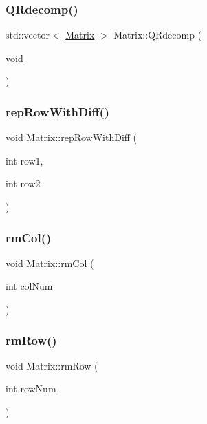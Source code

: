 \mbox{\label{class_matrix_ae7c92ceca24b8ca00926c93180c4cc24}} 
\subsubsection{\texorpdfstring{Q\+Rdecomp()}{QRdecomp()}}
{\footnotesize\ttfamily std\+::vector$<$ \mbox{\hyperlink{class_matrix}{Matrix}} $>$ Matrix\+::\+Q\+Rdecomp (\begin{DoxyParamCaption}\item[{void}]{ }\end{DoxyParamCaption})}

\mbox{\label{class_matrix_a1385f13513c2f00cf9dbe9eb45ccbc01}} 
\subsubsection{\texorpdfstring{rep\+Row\+With\+Diff()}{repRowWithDiff()}}
{\footnotesize\ttfamily void Matrix\+::rep\+Row\+With\+Diff (\begin{DoxyParamCaption}\item[{int}]{row1,  }\item[{int}]{row2 }\end{DoxyParamCaption})}

\mbox{\label{class_matrix_ac47f9d15d021312e0a33a341cc1e8032}} 
\subsubsection{\texorpdfstring{rm\+Col()}{rmCol()}}
{\footnotesize\ttfamily void Matrix\+::rm\+Col (\begin{DoxyParamCaption}\item[{int}]{col\+Num }\end{DoxyParamCaption})}

\mbox{\label{class_matrix_aab389448930cfd4b32158aa58ef5f87a}} 
\subsubsection{\texorpdfstring{rm\+Row()}{rmRow()}}
{\footnotesize\ttfamily void Matrix\+::rm\+Row (\begin{DoxyParamCaption}\item[{int}]{row\+Num }\end{DoxyParamCaption})}

